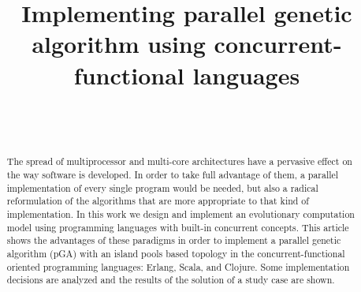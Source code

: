 \documentclass[9pt, technote]{IEEEtran}
\begin{document}
\title{Implementing parallel genetic algorithm using concurrent-functional languages}


\author{\\
\\
}






\maketitle

\begin{abstract}
The spread of multiprocessor and multi-core architectures have a
pervasive effect on the way software is developed. In order to take
full advantage of them, a parallel implementation of every single
program would be needed, but also a radical reformulation of the
algorithms that are more appropriate to that kind of implementation. 
 In this work we design and implement an evolutionary
computation model using programming languages with built-in concurrent
concepts. This article shows the advantages of these paradigms in
order to implement a  parallel genetic algorithm (pGA) with an island
pools based topology in the concurrent-functional oriented programming
languages: Erlang, Scala, and Clojure. Some implementation decisions
are analyzed and the results of the solution of a study case are
shown. 
\end{abstract}
\end{document}
